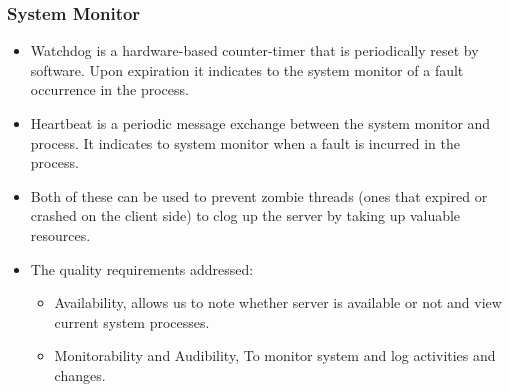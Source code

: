 \documentclass[12pt, oneside]{article}
\begin{document}
		\subsubsection{System Monitor}
			\begin{itemize}
				\item Watchdog is a hardware-based counter-timer that is periodically reset by software. Upon expiration it indicates to the system monitor of a fault occurrence in the process.
				
				\item Heartbeat is a periodic message exchange between the system monitor and process. It indicates to system monitor when a fault is incurred in the process.
				
				\item Both of these can be used to prevent zombie threads (ones that expired or crashed on the client side) to clog up the server by taking up valuable resources.
				
				\item The quality requirements addressed:
				\begin{itemize}
					\item Availability, allows us to note whether server is available or not and view current system processes.
					\item Monitorability and Audibility, To monitor system and log activities and changes.
				\end{itemize}
			\end{itemize}	
\end{document}

